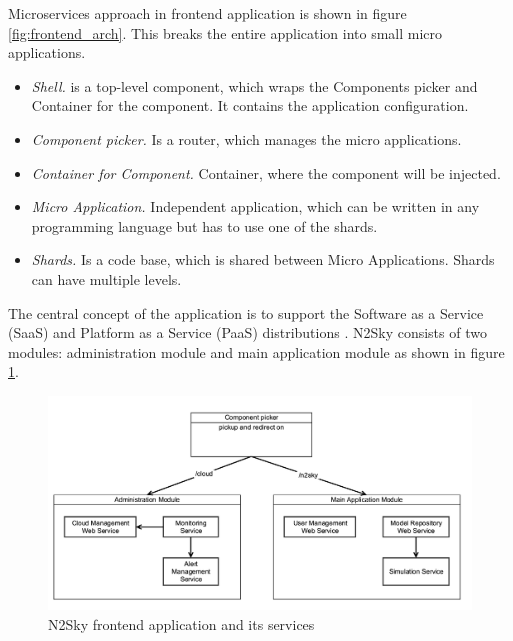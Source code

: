Microservices approach in frontend application is shown in figure \ref{fig:frontend_arch}. This breaks the entire application into small micro applications.

\begin{itemize}
\item \emph{Shell.}  is a top-level component, which wraps the Components picker and Container for the component. It contains the  application configuration.
\item \emph{Component picker.} Is a router, which manages the micro applications. 
\item \emph{Container for Component.} Container, where the component will be injected.
\item \emph{Micro Application.} Independent application, which can be written in any programming language but has to use one of the shards.
\item \emph{Shards.} Is a code base, which is shared between Micro Applications. Shards can have multiple levels. 
\end{itemize}
 

The central concept of the application is to support the Software as a Service (SaaS) and Platform as a Service (PaaS) distributions \cite{Walraven2014}.  N2Sky consists of two modules: administration module and main application module as shown in figure \ref{fig:modular_design}.

\begin{figure}[H]
\begin{center}
  \includegraphics[width=\linewidth]{components/2/redirector.png}
  \caption{N2Sky frontend application and its services}
  \label{fig:modular_design}
\end{center}
\end{figure}

